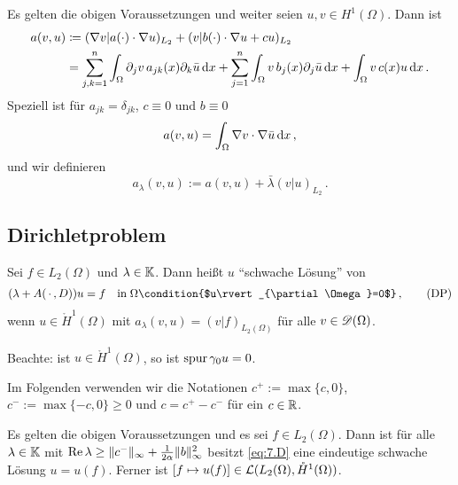 \begin{defi}
  Es gelten die obigen Voraussetzungen und weiter seien $u,v\in H^1(\Omega)$. Dann ist
  \begin{align*}
    a(v,u)&\coloneqq (\nabla v\vert a(\cdot)\cdot\nabla u)_{L_2}+(v\vert b(\cdot)\cdot\nabla u+cu)_{L_2} \\
    & =\sum_{j,k=1}^n\int_\Omega\partial_jv\, a_{jk}(x)\partial_k\bar u\,\mathrm{d} x
    +\sum_{j=1}^n\int_\Omega v\,  b_j(x)\partial_j\bar u\,\mathrm{d} x
    +\int_\Omega v\, c(x)u\,\mathrm{d} x\, .
  \end{align*}
  Speziell ist für $a_{jk}=\delta_{jk}$, $c\equiv 0$ und $b\equiv 0$
  \[ a(v,u)=\int_\Omega\nabla v\cdot\nabla\bar u\,\mathrm{d} x\, , \]
  und wir definieren
  \[ a_\lambda(v,u):=a(v,u)+\bar\lambda(v\vert u)_{L_2}\, . \]
\end{defi}

\subsection{Dirichletproblem}

\begin{defi}
  Sei $f\in L_2(\Omega)$ und $\lambda\in\mathbb{K}$. Dann heißt $u$ "`schwache Lösung"' von
  \begin{align}
    \label{eq:7.D}
    (\lambda+A(\, \cdot\, ,D))u=f\quad\text{in}\;\Omega
    \condition{$u\rvert_{\partial\Omega}=0$}\, , \tag{DP}
  \end{align}
  wenn $u\in\mathring H^1(\Omega)$ mit $a_\lambda(v,u)=(v\vert f)_{L_2(\Omega)}$ für alle $v\in\mathscr{D}(\Omega)$.

  Beachte: ist $u\in\mathring H^1(\Omega)$, so ist  $\operatorname{spur}\gamma_0 u=0$.
\end{defi}

Im Folgenden verwenden wir die Notationen $c^+:=\max\{c, 0\}$, $c^-:=\max\{-c, 0\}\geq0$ und $c=c^+-c^-$ für ein $c\in\mathbb{R}$.

\begin{theorem}
  \label{theorem:7.18} Es gelten die obigen Voraussetzungen und es sei $f\in L_2(\Omega)$. Dann ist für alle $\lambda\in\mathbb{K}$ mit $\operatorname{Re}\lambda\geq\lVert c^-\rVert_\infty+\frac1{2\alpha}\lVert b\rVert^2_\infty$ besitzt \eqref{eq:7.D} eine eindeutige schwache Lösung $u=u(f)$. Ferner ist $[f\mapsto u(f)]\in\mathcal{L}(L_2(\Omega),\mathring H^1(\Omega))$.
\end{theorem}

